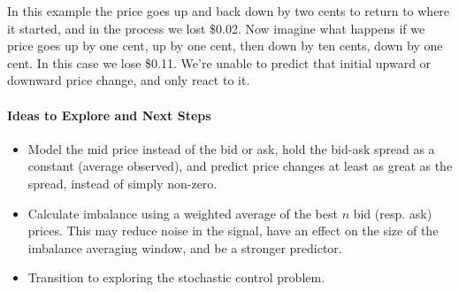 In this example the price goes up and back down by two cents to return to where it started, and in the process we lost \$0.02. Now imagine what happens if we price goes up by one cent, up by one cent, then down by ten cents, down by one cent. In this case we lose \$0.11. We're unable to predict that initial upward or downward price change, and only react to it. 

\paragraph{Ideas to Explore and Next Steps}
\begin{itemize}
\item Model the mid price instead of the bid or ask, hold the bid-ask spread as a constant (average observed), and predict price changes at least as great as the spread, instead of simply non-zero.
\item Calculate imbalance using a weighted average of the best $n$ bid (resp. ask) prices. This may reduce noise in the signal, have an effect on the size of the imbalance averaging window, and be a stronger predictor.
\item Transition to exploring the stochastic control problem.
\end{itemize}
